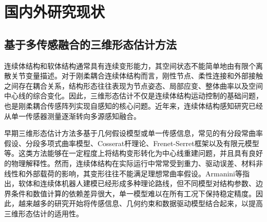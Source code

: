 \section{国内外研究现状}
\subsection{基于多传感融合的三维形态估计方法}
连续体结构和软体结构通常具有连续变形能力，其空间状态不能简单地由有限个离散关节变量描述。对于刚柔耦合连续体结构而言，刚性节点、柔性连接和外部接触之间存在耦合关系，结构形态往往表现为节点姿态、局部应变、整体曲率以及空间中心线的综合变化。因此，三维形态估计不仅是连续体结构运动控制的基础问题，也是刚柔耦合传感阵列实现自感知的核心问题。近年来，连续体结构感知研究已经从单一传感器测量逐渐转向多源感知融合。

早期三维形态估计方法多基于几何假设模型或单一传感信息，常见的有分段常曲率假设、分段多项式曲率模型、Cosserat杆理论、Frenet-Serret框架以及有限元模型等。这类方法能够在一定程度上将结构变形转化为中心线重建问题，并且具有良好的物理解释性。然而，连续体结构在实际运行中常常受到重力、驱动误差、材料非线性和外部载荷的影响，其变形往往不能满足理想常曲率假设。Armanini等指出，软体和连续体机器人建模已经形成多种理论路线，但不同模型对结构参数、边界条件和数值计算的依赖差异很大，单一模型难以在所有工况下保持稳定精度\cite{armanini2023soft}。因此，越来越多的研究开始将传感信息、几何约束和数据驱动模型结合起来，以提高三维形态估计的适用性。

